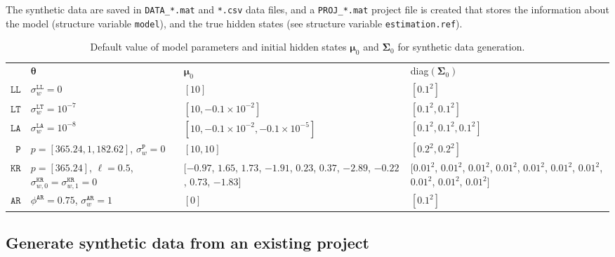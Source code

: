 The synthetic data are saved in \lstinline[basicstyle = \mlttfamily \small, backgroundcolor = \color{light-gray}]!DATA_*.mat! and \lstinline[basicstyle = \mlttfamily \small, backgroundcolor = \color{light-gray}]!*.csv! data files, and a \lstinline[basicstyle = \mlttfamily \small, backgroundcolor = \color{light-gray}]!PROJ_*.mat! project file is created that stores the information about the model (structure variable \lstinline[basicstyle = \mlttfamily \small, backgroundcolor = \color{light-gray}]!model!), and the true hidden states (see structure variable \lstinline[basicstyle = \mlttfamily \small, backgroundcolor = \color{light-gray}]!estimation.ref!).





\begin{table}[h]
     \caption{Default value of model parameters and initial hidden states $\bm{\mu}_{0}$ and $\mathbf{\Sigma}_{0}$ for synthetic data generation.} 
     \centering
     \begin{tabular}{r|lp{3.1cm}p{4cm}}\toprule
        & $\bm{\theta}$ & $\bm{\mu}_{0}$ & diag$(\mathbf{\Sigma}_{0})$ \\\cmidrule(lr){1-4}
    $\mathtt{LL}$   &  $\sigma_{w}^{\mathtt{LL}}=0$ &$[10]$ & $[0.1^{2}]$ \\
    $\mathtt{LT}$    & $\sigma_{w}^{\mathtt{LT}}=10^{-7}$ &  $[10, -0.1\times10^{-2}]$ & $[0.1^{2}, 0.1^{2}]$ \\
     $\mathtt{LA}$   & $\sigma_{w}^{\mathtt{LA}}=10^{-8}$  &  $[10, -0.1\times10^{-2} , -0.1\times10^{-5}]$ & $[0.1^{2}, 0.1^{2}, 0.1^{2}]$ \\
     $\mathtt{P}$  &  $p=[365.24, 1, 182.62] $, $\sigma_{w}^{\mathtt{P}}=0$  &$[10, 10]$ & $[0.2^{2}, 0.2^{2}]$  \\
     $\mathtt{KR}$  & $p=[365.24]$, $\ell=0.5$, $\sigma_{w,0}^{\mathtt{KR}}=\sigma_{w,1}^{\mathtt{KR}}=0$ &  $[$$-0.97$, $1.65$, $1.73$, $-1.91$, $0.23$, $0.37$, $-2.89$, $-0.22$, $0.73$, $-1.83$$]$ & $[$$0.01^{2}$, $0.01^{2}$, $0.01^{2}$, $0.01^{2}$, $0.01^{2}$, $0.01^{2}$, $0.01^{2}$, $0.01^{2}$, $0.01^{2}$, $0.01^{2}$$]$  \\  
         $\mathtt{AR}$   &  $\phi^{\mathtt{AR}}=0.75$, $\sigma_{w}^{\mathtt{AR}}=1$  &$[0]$ & $[0.1^{2}]$ \\\bottomrule
     \end{tabular}
\label{table:defaultsynthetic}
\end{table}

\subsection{Generate synthetic data from an existing project}



